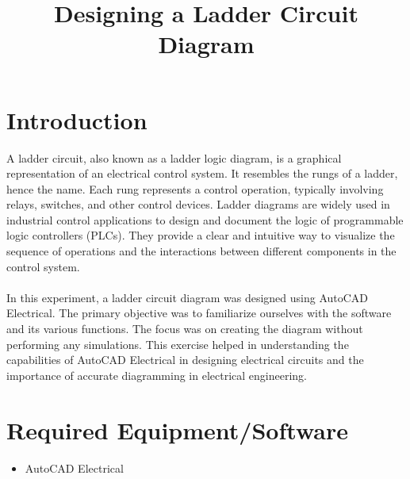 \documentclass[12pt]{article}
\title{Designing a Ladder Circuit Diagram}
\author{}
\date{}
\begin{document}


\pagebreak

\tableofcontents

\pagebreak
{}
\maketitle

\section*{Introduction}
A ladder circuit, also known as a ladder logic diagram, is a graphical representation of an electrical control system. It resembles the rungs of a ladder, hence the name. Each rung represents a control operation, typically involving relays, switches, and other control devices. Ladder diagrams are widely used in industrial control applications to design and document the logic of programmable logic controllers (PLCs). They provide a clear and intuitive way to visualize the sequence of operations and the interactions between different components in the control system.
\\\\
In this experiment, a ladder circuit diagram was designed using AutoCAD Electrical. The primary objective was to familiarize ourselves with the software and its various functions. The focus was on creating the diagram without performing any simulations. This exercise helped in understanding the capabilities of AutoCAD Electrical in designing electrical circuits and the importance of accurate diagramming in electrical engineering.

\section*{Required Equipment/Software}
\begin{itemize}
    \item AutoCAD Electrical
\end{itemize}
\end{document}
